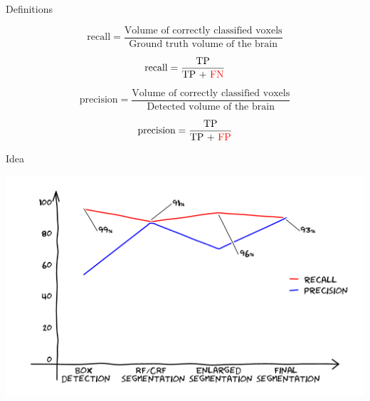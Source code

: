\documentclass[12pt]{beamer}
\begin{document}
\begin{frame}{Definitions}
\centering

\[
 \text{recall} = \frac{\text{Volume of correctly classified voxels}}
{\text{Ground truth volume of the brain}}
\]

\[
 \text{recall} = \frac{\text{TP}}{\text{TP + \textcolor{red}{FN}}}
\]

\[
 \text{precision} = \frac{\text{Volume of correctly classified voxels}}
{\text{Detected volume of the brain}}
\]

\[
 \text{precision} = \frac{\text{TP}}{\text{TP + \textcolor{red}{FP}}}
\]

\end{frame}

\begin{frame}{Idea}
\begin{center}
\includegraphics[height=0.8\textheight]{plot2.pdf}
\end{center}
\end{frame}
\end{document}
